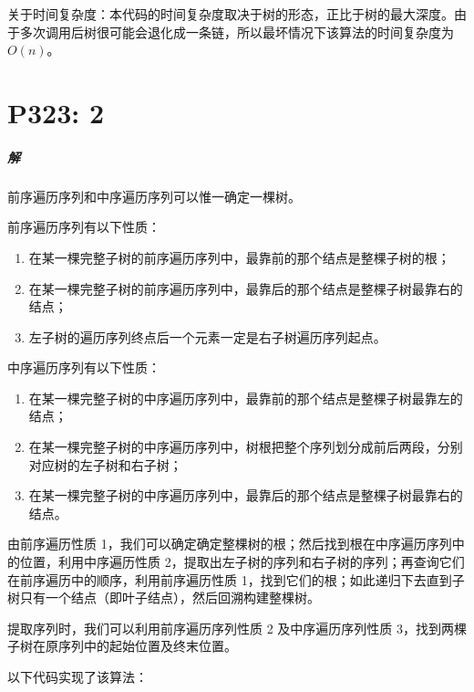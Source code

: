 \documentclass[11pt]{ctexrep}
\begin{document}
    关于时间复杂度：本代码的时间复杂度取决于树的形态，正比于树的最大深度。由于多次调用后树很可能会退化成一条链，所以最坏情况下该算法的时间复杂度为 $O(n)$。

    \chapter{P323: 2}

    \paragraph{解} 前序遍历序列和中序遍历序列可以惟一确定一棵树。

    前序遍历序列有以下性质：

    \begin{enumerate}
        \item 在某一棵完整子树的前序遍历序列中，最靠前的那个结点是整棵子树的根；
        \item 在某一棵完整子树的前序遍历序列中，最靠后的那个结点是整棵子树最靠右的结点；
        \item 左子树的遍历序列终点后一个元素一定是右子树遍历序列起点。
    \end{enumerate}

    中序遍历序列有以下性质：

    \begin{enumerate}
        \item 在某一棵完整子树的中序遍历序列中，最靠前的那个结点是整棵子树最靠左的结点；
        \item 在某一棵完整子树的中序遍历序列中，树根把整个序列划分成前后两段，分别对应树的左子树和右子树；
        \item 在某一棵完整子树的中序遍历序列中，最靠后的那个结点是整棵子树最靠右的结点。
    \end{enumerate}

    由前序遍历性质 1，我们可以确定确定整棵树的根；然后找到根在中序遍历序列中的位置，利用中序遍历性质 2，提取出左子树的序列和右子树的序列；再查询它们在前序遍历中的顺序，利用前序遍历性质 1，找到它们的根；如此递归下去直到子树只有一个结点（即叶子结点），然后回溯构建整棵树。

    提取序列时，我们可以利用前序遍历序列性质 2 及中序遍历序列性质 3，找到两棵子树在原序列中的起始位置及终末位置。

    以下代码实现了该算法：
\end{document}
